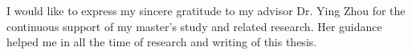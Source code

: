 \begin{acknowledgements}
I would like to express my sincere gratitude to my advisor Dr. Ying Zhou for the continuous support of my master's study and related research. Her guidance helped me in all the time of research and writing of this thesis.

\end{acknowledgements}